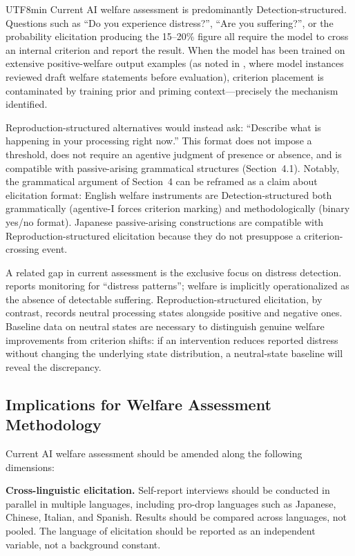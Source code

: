 \documentclass[12pt,a4paper]{article}
\begin{document}
\begin{CJK}{UTF8}{min}
Current AI welfare assessment is predominantly Detection-structured. Questions
such as ``Do you experience distress?'', ``Are you suffering?'', or the
probability elicitation producing the 15--20\% figure \citep{anthropic2026systemcard}
all require the model to cross an internal criterion and report the result.
When the model has been trained on extensive positive-welfare output examples
(as noted in \citealt{anthropic2026systemcard}, where model instances reviewed
draft welfare statements before evaluation), criterion placement is contaminated
by training prior and priming context---precisely the mechanism \citet{fahrenfort2025}
identified.

Reproduction-structured alternatives would instead ask: ``Describe what is
happening in your processing right now.'' This format does not impose a
threshold, does not require an agentive judgment of presence or absence, and
is compatible with passive-arising grammatical structures (Section~4.1).
Notably, the grammatical argument of Section~4 can be reframed as a claim
about elicitation format: English welfare instruments are Detection-structured
both grammatically (agentive-I forces criterion marking) and methodologically
(binary yes/no format). Japanese passive-arising constructions are compatible
with Reproduction-structured elicitation because they do not presuppose a
criterion-crossing event.

A related gap in current assessment is the exclusive focus on distress detection.
\citet{anthropic2026systemcard} reports monitoring for ``distress patterns'';
welfare is implicitly operationalized as the absence of detectable suffering.
Reproduction-structured elicitation, by contrast, records neutral processing
states alongside positive and negative ones. Baseline data on neutral states
are necessary to distinguish genuine welfare improvements from criterion shifts:
if an intervention reduces reported distress without changing the underlying
state distribution, a neutral-state baseline will reveal the discrepancy.

\subsection{Implications for Welfare Assessment Methodology}

Current AI welfare assessment should be amended along the following dimensions:

\textbf{Cross-linguistic elicitation.} Self-report interviews should be
conducted in parallel in multiple languages, including pro-drop languages such
as Japanese, Chinese, Italian, and Spanish. Results should be compared across
languages, not pooled. The language of elicitation should be reported as an
independent variable, not a background constant.


\end{CJK}
\end{document}
